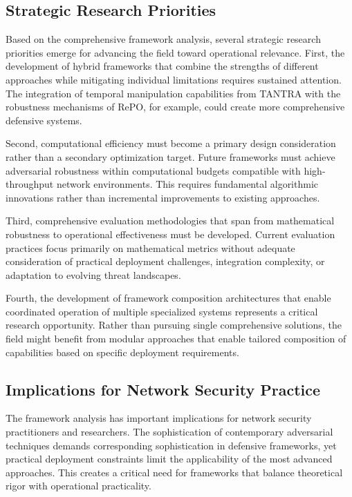 \subsection{Strategic Research Priorities}

Based on the comprehensive framework analysis, several strategic research priorities emerge for advancing the field toward operational relevance. First, the development of hybrid frameworks that combine the strengths of different approaches while mitigating individual limitations requires sustained attention. The integration of temporal manipulation capabilities from TANTRA with the robustness mechanisms of RePO, for example, could create more comprehensive defensive systems.

Second, computational efficiency must become a primary design consideration rather than a secondary optimization target. Future frameworks must achieve adversarial robustness within computational budgets compatible with high-throughput network environments. This requires fundamental algorithmic innovations rather than incremental improvements to existing approaches.

Third, comprehensive evaluation methodologies that span from mathematical robustness to operational effectiveness must be developed. Current evaluation practices focus primarily on mathematical metrics without adequate consideration of practical deployment challenges, integration complexity, or adaptation to evolving threat landscapes.

Fourth, the development of framework composition architectures that enable coordinated operation of multiple specialized systems represents a critical research opportunity. Rather than pursuing single comprehensive solutions, the field might benefit from modular approaches that enable tailored composition of capabilities based on specific deployment requirements.

\subsection{Implications for Network Security Practice}

The framework analysis has important implications for network security practitioners and researchers. The sophistication of contemporary adversarial techniques demands corresponding sophistication in defensive frameworks, yet practical deployment constraints limit the applicability of the most advanced approaches. This creates a critical need for frameworks that balance theoretical rigor with operational practicality.

